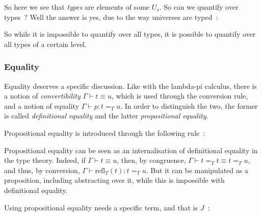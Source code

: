 So here we see that \emph{types} are elements of some $U_{s}$. So can we
quantify over types~? Well the answer is yes, due to the way universes are
typed~:

\begin{center}\begin{prooftree}
\end{prooftree}\end{center}

So while it is impossible to quantify over all types, it is possible to quantify
over all types of a certain level.

\subsubsection{Equality}\label{mltt-eq}

Equality deserves a specific discussion. Like with the lambda-pi calculus, there
is a notion of \emph{convertibility} $\Gamma\vdash t \equiv u$, which is used through the
conversion rule, and a notion of equality $\Gamma\vdash p : t =_{T} u$. In order to
distinguish the two, the former is called \emph{definitional equality} and the
latter \emph{propositional equality}.

Propositional equality is introduced through the following rule~:

\begin{center}\begin{prooftree}
\end{prooftree}\end{center}

Propositional equality can be seen as an internalisation of definitional
equality in the type theory. Indeed, if $\Gamma\vdash t \equiv u$, then, by congruence,
$\Gamma\vdash t =_{T} t \equiv t =_{T} u$, and thus, by conversion,
$\Gamma\vdash\text{refl}_{T}(t) : t =_{T} u$. But it can be manipulated as a proposition,
including abstracting over it, while this is impossible with definitional
equality.

Using propositional equality needs a specific term, and that is $J$~:

\begin{center}\begin{prooftree}
\end{prooftree}\end{center}

